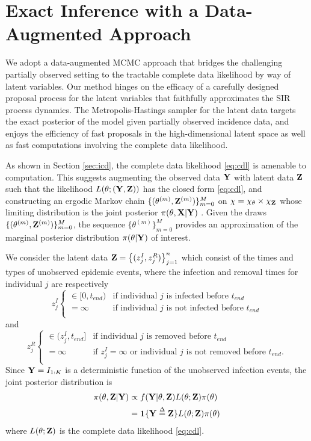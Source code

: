 \documentclass[11pt]{article}
\begin{document}
	\section{Exact Inference with a  Data-Augmented Approach}
	\label{sec:con}
	
	We adopt a data-augmented MCMC approach that bridges the challenging partially observed setting to the tractable complete data likelihood by way of latent variables. Our method hinges on the efficacy of a carefully designed proposal process for the latent variables that faithfully approximates the SIR process dynamics.
	The Metropolis-Hastings sampler for the latent data targets the exact posterior of the model given partially observed incidence data, and enjoys the efficiency of fast proposals in the high-dimensional latent space as well as fast computations involving the complete data likelihood.
	
	As shown in Section \ref{sec:icd}, the complete data likelihood \eqref{eq:cdl} is amenable to computation. This suggests augmenting the observed data $\mathbf{Y}$ with latent data $\mathbf{Z}$ such that the likelihood $L(\theta; (\mathbf{Y}, \mathbf{Z}))$ has the closed form \eqref{eq:cdl}, and constructing an ergodic Markov chain $\{(\theta^{(m)}, \mathbf{Z}^{(m)})\}_{m=0}^M$ on $\chi = \chi_{\theta} \times \chi_{\mathbf{Z}}$ whose limiting distribution is the joint posterior $\pi(\theta, \mathbf{X}|\mathbf{Y})$ \cite{Gibson.1998, ONeill.1999, Fintzi.2017}. Given the draws $\{(\theta^{(m)}, \mathbf{Z}^{(m)})\}_{m=0}^M$, the sequence $\{\theta^{(m)}\}_{m=0}^M$ provides an approximation of the marginal posterior distribution $\pi(\theta|\mathbf{Y})$ of interest.
	
	We consider the latent data $\mathbf{Z} = \left\lbrace (z^I_j, z^R_j)\right\rbrace_{j=1}^{n}$ which consist of the times and types of unobserved epidemic events, where the infection and removal times for individual $j$ are respectively
	$$z^I_j \begin{cases}
		\in [0, t_{end}) & \text{if individual } j \text{ is infected before } t_{end} \\
		= \infty & \text{if individual } j \text{ is not infected before } t_{end} \\
	\end{cases}$$
	and
	$$z^R_j \begin{cases}
		\in (z^I_j, t_{end}] & \text{if individual } j \text{ is removed before } t_{end} \\
		= \infty & \text{if } z^I_j = \infty \text{ or individual } j \text{ is not removed before } t_{end}. \\
	\end{cases}$$
	Since $\mathbf{Y} = I_{1:K}$ is a deterministic function of the unobserved infection events, the joint posterior distribution is
	\begin{align*}
	    \pi(\theta, \mathbf{Z}|\mathbf{Y})
	    & \propto f(\mathbf{Y}|\theta, \mathbf{Z}) L(\theta; \mathbf{Z}) \pi(\theta) \\
	    & = \mathbf{1}\{\mathbf{Y} \overset{\Delta}{=} \mathbf{Z}\} L(\theta; \mathbf{Z}) \pi(\theta)
	\end{align*}
	where $L(\theta; \mathbf{Z})$ is the complete data likelihood \ref{eq:cdl}.
	
\end{document}
